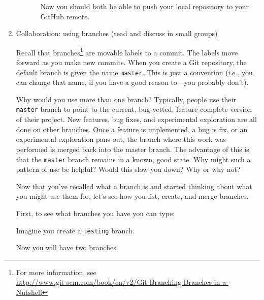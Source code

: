 \documentclass{article}
\begin{document}
\begin{enumerate}
\begin{enumerate}
\begin{itemize}
%
%
%

Now you should both be able to push your local repository to your
GitHub remote.

\end{itemize}

\end{enumerate}

\item Collaboration: using branches (read and discuss in small groups)

Recall that branches\footnote{For more information, see\\
\url{http://www.git-scm.com/book/en/v2/Git-Branching-Branches-in-a-Nutshell}}
are movable labels to a commit. The labels move forward as you make new
commits. When you create a Git repository, the default branch is given the name
\texttt{master}.  This is just a convention (i.e., you can change that name, if
you have a good reason to---you probably don't).

Why would you use more than one branch?  Typically, people use their
\texttt{master} branch to point to the current, bug-vetted, feature complete
version of their project.  New features, bug fixes, and experimental
exploration are all done on other branches.  Once a feature is implemented, 
a bug is fix, or an experimental exploration pans out, the branch where
this work was performed is merged back into the master branch.  The
advantage of this is that the \texttt{master} branch remains in a known,
good state.  Why might such a pattern of use be helpful?  Would this slow
you down?  Why or why not?

Now that you've recalled what a branch is and started thinking about what
you might use them for, let's see how you list, create, and merge branches.

First, to see what branches you have you can type:

Imagine you create a \texttt{testing} branch.

Now you will have two branches.


\end{enumerate}
\end{document}
